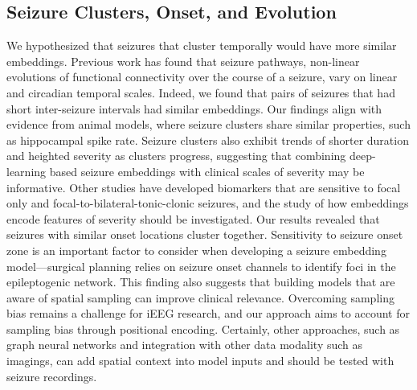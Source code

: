\documentclass[11pt]{article}
\begin{document}
\subsection*{Seizure Clusters, Onset, and Evolution}
We hypothesized that seizures that cluster temporally would have more similar embeddings. Previous work has found that seizure pathways, non-linear evolutions of functional connectivity over the course of a seizure, vary on linear and circadian temporal scales\cite{Schroeder2020Seizure,Panagiotopoulou2021Fluctuations}. Indeed, we found that pairs of seizures that had short inter-seizure intervals had similar embeddings. Our findings align with evidence from animal models, where seizure clusters share similar properties, such as hippocampal spike rate\cite{Kudlacek2021Long}. Seizure clusters also exhibit trends of shorter duration and heighted severity as clusters progress, suggesting that combining deep-learning based seizure embeddings with clinical scales of severity may be informative\cite{Pattnaik2023seizure,Cramer2001Quantitative}. Other studies have developed biomarkers that are sensitive to focal only and focal-to-bilateral-tonic-clonic seizures, and the study of how embeddings encode features of severity should be investigated\cite{Khambhati2016Virtual}. Our results revealed that seizures with similar onset locations cluster together. Sensitivity to seizure onset zone is an important factor to consider when developing a seizure embedding model\cite{Balaji2022Seizure}—surgical planning relies on seizure onset channels to identify foci in the epileptogenic network. This finding also suggests that building models that are aware of spatial sampling can improve clinical relevance. Overcoming sampling bias remains a challenge for iEEG research\cite{Conrad2020sensitivity, Conrad2022Addressing, Shi2024Utility}, and our approach aims to account for sampling bias through positional encoding. Certainly, other approaches, such as graph neural networks\cite{Grattarola2022Seizure, Asif2021Graph, Lian2020Learning} and integration with other data modality such as imagings, can add spatial context into model inputs and should be tested with seizure recordings.
\end{document}
